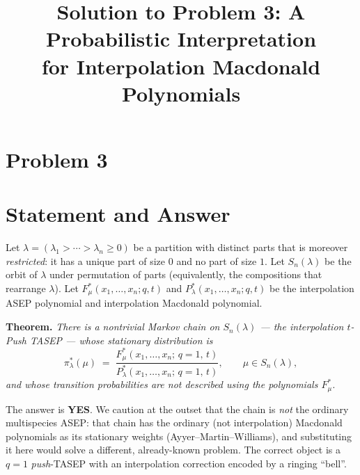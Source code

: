 \clearpage
\section*{Problem 3}
\begingroup
\hypersetup{colorlinks=true,
            linkcolor=blue!50!black,
            citecolor=blue!50!black,
            urlcolor=blue!50!black}
\newcommand{\qthreeR}{\mathbb{R}}
\newcommand{\qthreeN}{\mathbb{N}}
\newcommand{\qthreeZ}{\mathbb{Z}}
\newcommand{\qthreeSnl}{S_n(\lambda)}
\newcommand{\qthreewt}{\operatorname{wt}}
\newtheorem{qthreetheorem}{Theorem}
\newtheorem{qthreelemma}{Lemma}
\newtheorem{qthreeproposition}{Proposition}
\newtheorem{qthreecorollary}{Corollary}
\theoremstyle{definition}
\newtheorem{qthreedefinition}{Definition}
\newtheorem{qthreeremark}{Remark}
\title{Solution to Problem 3: A Probabilistic Interpretation\\
for Interpolation Macdonald Polynomials}
\author{}
\date{}
\maketitle


\section*{Statement and Answer}

Let $\lambda=(\lambda_1>\cdots>\lambda_n\ge0)$ be a partition with distinct
parts that is moreover \emph{restricted}: it has a unique part of size $0$ and no
part of size $1$. Let $\qthreeSnl$ be the orbit of $\lambda$ under permutation of
parts (equivalently, the compositions that rearrange $\lambda$). Let
$F^*_\mu(x_1,\dots,x_n;q,t)$ and $P^*_\lambda(x_1,\dots,x_n;q,t)$ be the
interpolation ASEP polynomial and interpolation Macdonald polynomial.

\medskip
\noindent\textbf{Theorem.} \emph{There is a nontrivial Markov chain on $\qthreeSnl$ ---
the \emph{interpolation $t$-Push TASEP} --- whose stationary distribution is}
\[
\pi^*_\lambda(\mu)\;=\;\frac{F^*_\mu(x_1,\dots,x_n;\,q=1,\,t)}{P^*_\lambda(x_1,\dots,x_n;\,q=1,\,t)},
\qquad \mu\in\qthreeSnl,
\]
\emph{and whose transition probabilities are not described using the
polynomials $F^*_\mu$.}

\medskip
\noindent The answer is \textbf{YES}. We caution at the outset that the chain is
\emph{not} the ordinary multispecies ASEP: that chain has the ordinary (not
interpolation) Macdonald polynomials as its stationary weights (Ayyer--Martin--Williams),
and substituting it here would solve a different, already-known problem. The
correct object is a $q=1$ \emph{push}-TASEP with an interpolation correction
encoded by a ringing ``bell''.

